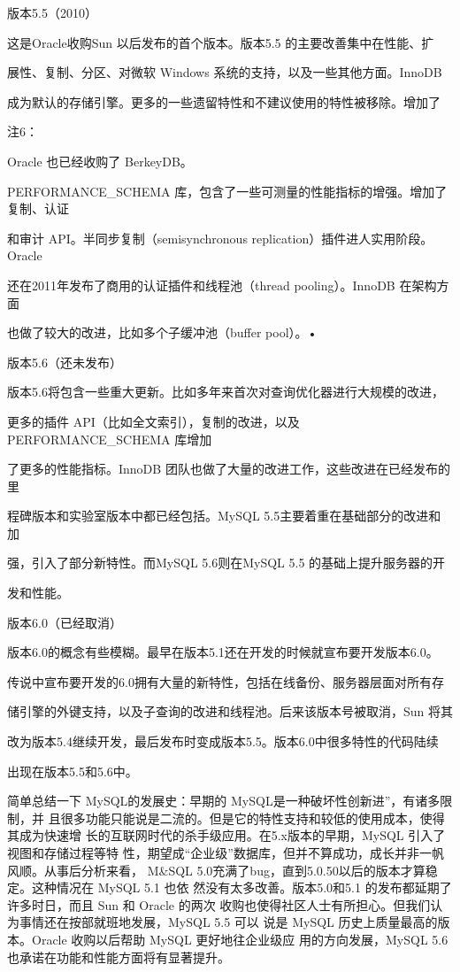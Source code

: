 版本5.5（2010）

这是Oracle收购Sun 以后发布的首个版本。版本5.5 的主要改善集中在性能、扩

展性、复制、分区、对微软 Windows 系统的支持，以及一些其他方面。InnoDB

成为默认的存储引擎。更多的一些遗留特性和不建议使用的特性被移除。增加了

注6：

Oracle 也已经收购了 BerkeyDB。

PERFORMANCE\_SCHEMA 库，包含了一些可测量的性能指标的增强。增加了复制、认证

和审计 API。半同步复制（semisynchronous replication）插件进人实用阶段。Oracle

还在2011年发布了商用的认证插件和线程池（thread pooling）。InnoDB 在架构方面

也做了较大的改进，比如多个子缓冲池（buffer pool）。•

版本5.6（还未发布）

版本5.6将包含一些重大更新。比如多年来首次对查询优化器进行大规模的改进，

更多的插件 API（比如全文索引），复制的改进，以及 PERFORMANCE\_SCHEMA 库增加

了更多的性能指标。InnoDB 团队也做了大量的改进工作，这些改进在已经发布的里

程碑版本和实验室版本中都已经包括。MySQL 5.5主要着重在基础部分的改进和加

强，引入了部分新特性。而MySQL 5.6则在MySQL 5.5 的基础上提升服务器的开

发和性能。

版本6.0（已经取消）

版本6.0的概念有些模糊。最早在版本5.1还在开发的时候就宣布要开发版本6.0。

传说中宣布要开发的6.0拥有大量的新特性，包括在线备份、服务器层面对所有存

储引擎的外键支持，以及子查询的改进和线程池。后来该版本号被取消，Sun 将其

改为版本5.4继续开发，最后发布时变成版本5.5。版本6.0中很多特性的代码陆续

出现在版本5.5和5.6中。

简单总结一下 MySQL的发展史：早期的 MySQL是一种破坏性创新进”，有诸多限制，并
且很多功能只能说是二流的。但是它的特性支持和较低的使用成本，使得其成为快速增
长的互联网时代的杀手级应用。在5.x版本的早期，MySQL 引入了视图和存储过程等特
性，期望成“企业级”数据库，但并不算成功，成长并非一帆风顺。从事后分析来看，
M&SQL 5.0充满了bug，直到5.0.50以后的版本才算稳定。这种情况在 MySQL 5.1 也依
然没有太多改善。版本5.0和5.1 的发布都延期了许多时日，而且 Sun 和 Oracle 的两次
收购也使得社区人士有所担心。但我们认为事情还在按部就班地发展，MySQL 5.5 可以
说是 MySQL 历史上质量最高的版本。Oracle 收购以后帮助 MySQL 更好地往企业级应
用的方向发展，MySQL 5.6 也承诺在功能和性能方面将有显著提升。

